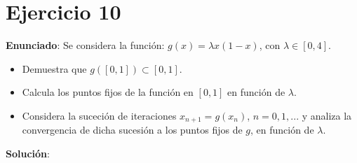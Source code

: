 \documentclass[11pt]{article}
\begin{document}
\section{Ejercicio 10}
\textbf{Enunciado}: Se considera la función: $g(x) = \lambda x(1-x)$, con $\lambda \in [0,4]$.
\begin{itemize}
	\item Demuestra que $g([0,1]) \subset [0,1]$.
	\item Calcula los puntos fijos de la función en $[0,1]$ en función de $\lambda$.
	\item Considera la suceción de iteraciones $x_{n+1} = g(x_n)$, $n=0,1,...$ y analiza la convergencia de dicha sucesión a los puntos fijos de $g$, en función de $\lambda$.
\end{itemize}

\textbf{Solución}:\\
\end{document}

